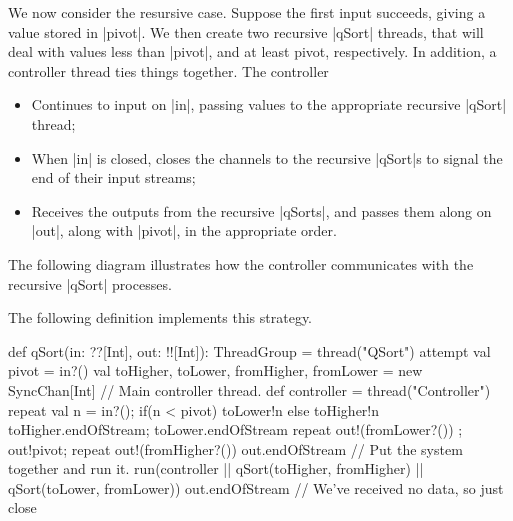 We now consider the resursive case.  Suppose the first input succeeds, giving
a value stored in |pivot|.  We then create two recursive |qSort| threads, that
will deal with values less than |pivot|, and at least pivot, respectively.  In
addition, a controller thread ties things together.  The controller
%
\begin{itemize}
\item Continues to input on |in|, passing values to the appropriate recursive
  |qSort| thread;

\item When |in| is closed, closes the channels to the recursive |qSort|s to
  signal the end of their input streams;

\item Receives the outputs from the recursive |qSorts|, and passes them along
  on |out|, along with |pivot|, in the appropriate order.
\end{itemize}
%
The following diagram illustrates how the controller communicates with the
recursive |qSort| processes.
%
\begin{center}
\end{center}


The following definition implements this strategy.
%
\begin{scala}
  def qSort(in: ??[Int], out: !![Int]): ThreadGroup = thread("QSort"){
    attempt{
      val pivot = in?()
      val toHigher, toLower, fromHigher, fromLower = new SyncChan[Int]
      // Main controller thread.
      def controller = thread("Controller"){
        repeat{ val n = in?(); if(n < pivot) toLower!n else toHigher!n }
	toHigher.endOfStream; toLower.endOfStream
        repeat{ out!(fromLower?()) }; out!pivot; repeat{ out!(fromHigher?()) }
        out.endOfStream
      }      
      // Put the system together and run it.
      run(controller || qSort(toHigher, fromHigher) || qSort(toLower, fromLower))
    }{ out.endOfStream } // We've received no data, so just close
  }
\end{scala}

